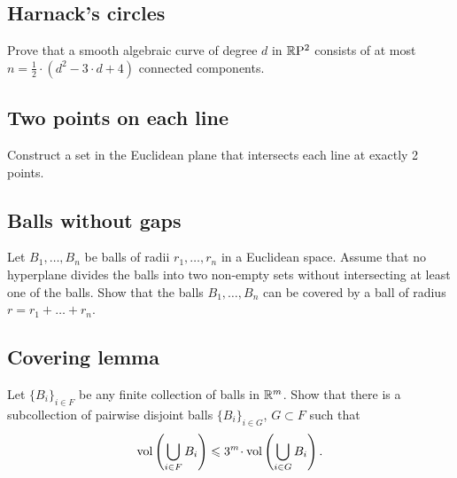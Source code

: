 \subsection*{Harnack's circles}\label{Harnack}

\begin{pr}
Prove that a smooth algebraic curve of degree $d$ in $\mathbb{R}\mathrm{P}^2$ consists of at most $n=\tfrac12\cdot(d^2-3\cdot d+4)$ connected components.
\end{pr}

\subsection*{Two points on each line}\label{2pts-on-line}

\begin{pr}
Construct a set in the Euclidean plane that intersects each line at exactly 2 points. 
\end{pr}

\subsection*{Balls without gaps}
\label{Balls without gaps}

\begin{pr}
Let $B_1,\dots,B_n$ be balls  
of radii $r_1,\dots,r_n$ 
in a Euclidean space.
Assume that no hyperplane divides the balls into two
non-empty sets without intersecting at least one of the balls. 
Show that the balls
$B_1,\dots,B_n$ can be covered by a ball of radius
$r=r_1+\dots+r_n$.

\end{pr}

\subsection*{Covering lemma}

\begin{pr}
Let $\{B_i\}_{i\in F}$ be any finite collection of  balls in $\mathbb{R}^m$. 
Show that there is a subcollection of pairwise disjoint balls $\{B_i\}_{i\in G}$, $G\subset F$
such that
\[\vol \left(\bigcup_{i\in F}B_i\right)\le 3^m\cdot \vol \left(\bigcup_{i\in G}B_i\right).\]
\end{pr}



